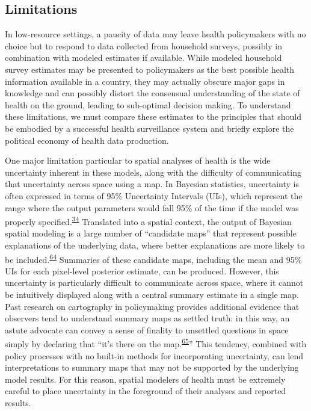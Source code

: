 \documentclass[
]{article}
\begin{document}
\hypertarget{limitations}{%
\subsection{Limitations}\label{limitations}}

In low-resource settings, a paucity of data may leave health policymakers with no choice but to respond to data collected from household surveys, possibly in combination with modeled estimates if available. While modeled household survey estimates may be presented to policymakers as the best possible health information available in a country, they may actually obscure major gaps in knowledge and can possibly distort the consensual understanding of the state of health on the ground, leading to sub-optimal decision making. To understand these limitations, we must compare these estimates to the principles that should be embodied by a successful health surveillance system and briefly explore the political economy of health data production.

One major limitation particular to spatial analyses of health is the wide uncertainty inherent in these models, along with the difficulty of communicating that uncertainty across space using a map. In Bayesian statistics, uncertainty is often expressed in terms of 95\% Uncertainty Intervals (UIs), which represent the range where the output parameters would fall 95\% of the time if the model was properly specified.\textsuperscript{\protect\hyperlink{ref-McElreath2016}{34}} Translated into a spatial context, the output of Bayesian spatial modeling is a large number of ``candidate maps'' that represent possible explanations of the underlying data, where better explanations are more likely to be included.\textsuperscript{\protect\hyperlink{ref-Patil2011}{64}} Summaries of these candidate maps, including the mean and 95\% UIs for each pixel-level posterior estimate, can be produced. However, this uncertainty is particularly difficult to communicate across space, where it cannot be intuitively displayed along with a central summary estimate in a single map. Past research on cartography in policymaking provides additional evidence that observers tend to understand summary maps as settled truth: in this way, an astute advocate can convey a sense of finality to unsettled questions in space simply by declaring that ``it's there on the map.\textsuperscript{\protect\hyperlink{ref-Elwood2006}{65}}'' This tendency, combined with policy processes with no built-in methods for incorporating uncertainty, can lend interpretations to summary maps that may not be supported by the underlying model results. For this reason, spatial modelers of health must be extremely careful to place uncertainty in the foreground of their analyses and reported results.
\end{document}
